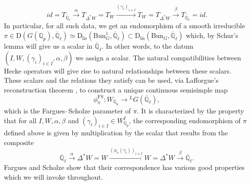 \documentclass[reqno,11pt]{amsart}
\theoremstyle{remark}
\newcommand{\Bun}{\mathrm{Bun}}
\newcommand{\Dc}{\mathrm{D}}
\newcommand{\Dlis}{\mathrm{D}_{\mathrm{lis}}}
\def\ol{\overline}
\begin{document}
\[ id = T_{\overline{\mathbb{Q}}_{\ell}} \xrightarrow{\alpha} T_{\Delta^{*}W} = T_{W} \xrightarrow{(\gamma_{i})_{i \in I}} T_{W} = T_{\Delta^{*}W}  \xrightarrow{\beta} T_{\overline{\mathbb{Q}}_{\ell}} = id. \]
In particular, for all such data, we get an endomorphism of a smooth irreducible $\pi \in \Dc(G(\mathbb{Q}_{p}),\ol{\mathbb{Q}}_{\ell}) \simeq \Dlis(\Bun_{G}^{1},\ol{\mathbb{Q}}_{\ell}) \subset \Dlis(\Bun_{G},\ol{\mathbb{Q}}_{\ell})$ which, by Schur's lemma will give us a scalar in $\ol{\mathbb{Q}}_{\ell}$. In other words, to the datum $(I,W,(\gamma_{i})_{i \in I},\alpha,\beta)$ we assign a scalar. The natural compatibilities between Hecke operators will give rise to natural relationships between these scalars. These scalars and the relations they satisfy can be used, via Lafforgue's reconstruction theorem \cite[Proposition~11.7]{VL}, to construct a unique continuous semisimple map
\[ \phi^{\mathrm{FS}}_{\pi}: W_{\mathbb{Q}_{p}} \rightarrow \phantom{}^{L}G(\overline{\mathbb{Q}}_{\ell}), \]
which is the Fargues--Scholze parameter of $\pi$. It is characterized by the property that for all $I,W,\alpha,\beta$ and $(\gamma_{i})_{i \in I} \in W_{\mathbb{Q}_{p}}^{I}$, the corresponding endomorphism of $\pi$ defined above is given by multiplication by the scalar that results from the composite
\[ \overline{\mathbb{Q}}_{\ell} \xrightarrow{\alpha} \Delta^{*}W = W \xrightarrow{(\phi_{\pi}(\gamma_{i}))_{i \in I}} W = \Delta^{*}W \xrightarrow{\beta} \overline{\mathbb{Q}}_{\ell}. \]
Fargues and Scholze show that their correspondence has various good properties which we will invoke throughout. 
\end{document}
